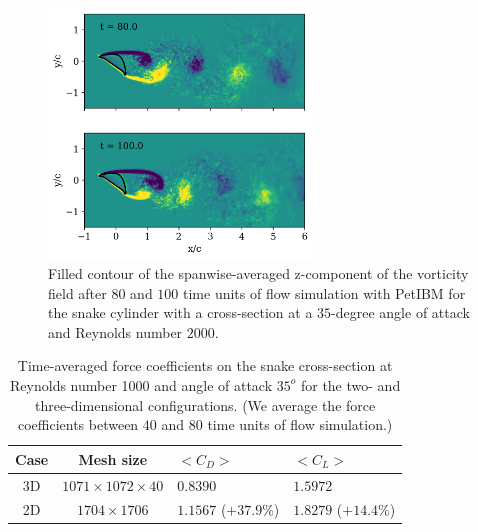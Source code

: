 \documentclass[10pt,journal,compsoc]{IEEEtran}
\begin{document}
\begin{figure}[!h]
    \centering
    \includegraphics[width=7cm]{figures/wz_avg_multi_contourf.png}
    \caption{Filled contour of the spanwise-averaged z-component of the vorticity field after $80$ and $100$ time units of flow simulation with PetIBM for the snake cylinder with a cross-section at a $35$-degree angle of attack and Reynolds number $2000$.}
    \label{fig:wz_avg_3d}
\end{figure}

\begin{table}[!h]
    \caption{Time-averaged force coefficients on the snake cross-section at Reynolds number 1000 and angle of attack $35^o$ for the two- and three-dimensional configurations. (We average the force coefficients between $40$ and $80$ time units of flow simulation.)}
    \label{tab:force_coefficients}
    \centering
    \begin{tabular}{ccll}
        \hline
        Case & Mesh size & $<C_D>$ & $<C_L>$ \\
        \hline
        3D & $1071 \times 1072 \times 40$ & $0.8390$ & $1.5972$ \\
        2D & $1704 \times 1706$ & $1.1567$ ($+37.9\%$) & $1.8279$ ($+14.4\%$) \\
        \hline
    \end{tabular}
\end{table}




%
\end{document}

